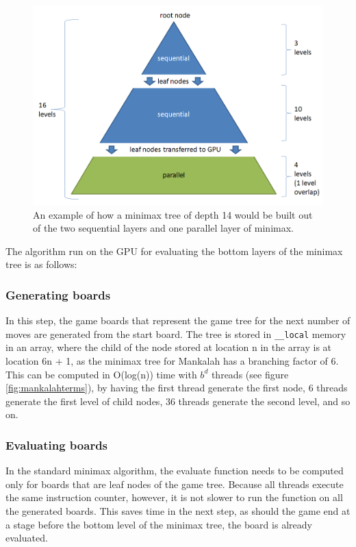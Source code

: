 \documentclass{article}
\begin{document}
\begin{figure}[ht!]
\centering
\includegraphics[width=120mm]{mankalah-depths.png}
\caption{An example of how a minimax tree of depth 14 would be built out of the two sequential layers and one parallel layer of minimax.}
\label{fig:mankalahdepths}
\end{figure}

The algorithm run on the GPU for evaluating the bottom layers of the minimax tree is as follows:

\subsubsection{Generating boards}
In this step, the game boards that represent the game tree for the next number of moves are generated from the start board. The tree is stored in \texttt{\_\_local} memory in an array, where the child of the node stored at location n in the array is at location 6n + 1, as the minimax tree for Mankalah has a branching factor of 6. This can be computed in O(log(n)) time with $b^{d}$ threads (see figure \ref{fig:mankalahterms}), by having the first thread generate the first node, 6 threads generate the first level of child nodes, 36 threads generate the second level, and so on.

\subsubsection{Evaluating boards}
In the standard minimax algorithm, the evaluate function needs to be computed only for boards that are leaf nodes of the game tree. Because all threads execute the same instruction counter, however, it is not slower to run the function on all the generated boards. This saves time in the next step, as should the game end at a stage before the bottom level of the minimax tree, the board is already evaluated.
\end{document}
